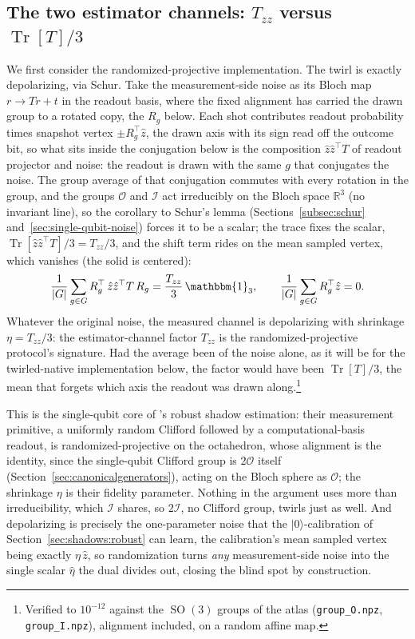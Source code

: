 \documentclass[11pt, oneside, openany]{scrbook}
\DeclareMathOperator{\SO}{SO}
\DeclareMathOperator{\Tr}{Tr}
\newcommand{\R}{\mathbb{R}}
\newcommand{\Id}{\mathbbm{1}}
\newcommand{\Ogroup}{\mathcal{O}}  %
\newcommand{\Igroup}{\mathcal{I}}  %
\newcommand{\TwoO}{2\Ogroup}
\newcommand{\TwoI}{2\Igroup}
\newcommand{\ket}[1]{|#1\rangle}
\begin{document}
\subsection{The two estimator channels: \texorpdfstring{$T_{zz}$ versus $\Tr[T]/3$}{Tzz versus Tr[T]/3}} \label{sec:shadows:channels}

We first consider the randomized-projective implementation. The twirl is exactly depolarizing, via Schur. Take the measurement-side noise as its Bloch map $r \to T r + t$ in the readout basis, where the fixed alignment has carried the drawn group to a rotated copy, the $R_g$ below. Each shot contributes readout probability times snapshot vertex $\pm R_g^\top \hat z$, the drawn axis with its sign read off the outcome bit, so what sits inside the conjugation below is the composition $\hat z \hat z^\top T$ of readout projector and noise: the readout is drawn with the same $g$ that conjugates the noise. The group average of that conjugation commutes with every rotation in the group, and the groups $\Ogroup$ and $\Igroup$ act irreducibly on the Bloch space $\R^3$ (no invariant line), so the corollary to Schur's lemma (Sections~\ref{subsec:schur} and~\ref{sec:single-qubit-noise}) forces it to be a scalar; the trace fixes the scalar, $\Tr[\hat z \hat z^\top T]/3 = T_{zz}/3$, and the shift term rides on the mean sampled vertex, which vanishes (the solid is centered):
\begin{equation*}
  \frac{1}{|G|}\sum_{g \in G} R_g^\top\, \hat z \hat z^\top T\, R_g = \frac{T_{zz}}{3}\,\Id_3, \qquad \frac{1}{|G|}\sum_{g \in G} R_g^\top \hat z = 0.
\end{equation*}
Whatever the original noise, the measured channel is depolarizing with shrinkage $\eta = T_{zz}/3$: the estimator-channel factor $T_{zz}$ is the randomized-projective protocol's signature. Had the average been of the noise alone, as it will be for the twirled-native implementation below, the factor would have been $\Tr[T]/3$, the mean that forgets which axis the readout was drawn along.\footnote{Verified to $10^{-12}$ against the $\SO(3)$ groups of the atlas (\texttt{group\_O.npz}, \texttt{group\_I.npz}), alignment included, on a random affine map.}

This is the single-qubit core of \textcite{chen2021robustshadowestimationa}'s robust shadow estimation: their measurement primitive, a uniformly random Clifford followed by a computational-basis readout, is randomized-projective on the octahedron, whose alignment is the identity, since the single-qubit Clifford group is $\TwoO$ itself (Section~\ref{sec:canonicalgenerators}), acting on the Bloch sphere as $\Ogroup$; the shrinkage $\eta$ is their fidelity parameter. Nothing in the argument uses more than irreducibility, which $\Igroup$ shares, so $\TwoI$, no Clifford group, twirls just as well. And depolarizing is precisely the one-parameter noise that the $\ket{0}$-calibration of Section~\ref{sec:shadows:robust} can learn, the calibration's mean sampled vertex being exactly $\eta\,\hat z$, so randomization turns \textit{any} measurement-side noise into the single scalar $\hat\eta$ the dual divides out, closing the blind spot by construction.
\end{document}
